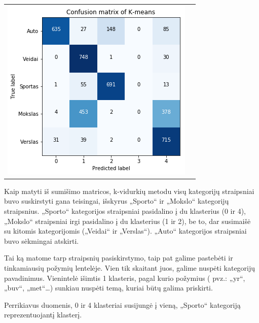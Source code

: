 \documentclass{VUMIFInfKursinis}
\begin{document}
\begin{table}[!h]
\begin{tabular}{ll}
\begin{minipage}[t]{0.47\columnwidth}
		\includegraphics[width=\columnwidth]{./Pictures/100002010000015E0000014D77AD2EBC2026345C.png}\strut
		\center{b)}
	\end{minipage}
\end{tabular}
\end{table}

Kaip matyti iš sumišimo matricos, k-vidurkių metodu visų kategorijų
straipsniai buvo suskirstyti gana teisingai, išskyrus „Sporto“ ir
„Mokslo“ kategorijų straipsnius. „Sporto“ kategorijos straipsniai
pasidalino į du klasterius (0 ir 4), „Mokslo“ straipsniai irgi
pasidalino į du klasterius (1 ir 2), be to, dar susimaišė su kitomis
kategorijomis („Veidai“ ir „Verslas“). „Auto“ kategorijos straipsniai
buvo sėkmingai atskirti.

Tai ką matome tarp straipsnių pasiskirstymo, taip pat galime pastebėti
ir tinkamiausių požymių lentelėje. Vien tik skaitant juos, galime
nuspėti kategorijų pavadinimus. Vienintelė išimtis 1 klasteris, pagal
kurio požymius ( pvz.: „yr“, „buv“, „met“\ldots{}) sunkiau nuspėti
temą, kuriai būtų galima priskirti.

Perrikiavus duomenis, 0 ir 4 klasteriai susijungė į vieną, „Sporto“
kategoriją reprezentuojantį klasterį.
\end{document}
